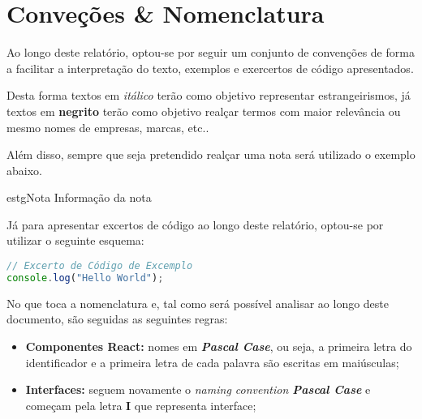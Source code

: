 \chapter*{Conveções \& Nomenclatura}

Ao longo deste relatório, optou-se por seguir um conjunto de convenções de forma a facilitar a interpretação do texto, exemplos e exercertos de código apresentados.

Desta forma textos em \textit{itálico} terão como objetivo representar estrangeirismos, já textos em \textbf{negrito} terão como objetivo realçar termos com maior relevância ou mesmo nomes de empresas, marcas, etc..

Além disso, sempre que seja pretendido realçar uma nota será utilizado o exemplo abaixo.\\[0.01cm]

\begin{mybox}{estg}{Nota}
	Informação da nota
\end{mybox}

\vspace{0.1cm}

Já para apresentar excertos de código ao longo deste relatório, optou-se por utilizar o seguinte esquema:\\[0.01cm]

\begin{lstlisting}[language=Javascript]
// Excerto de Código de Excemplo
console.log("Hello World");
\end{lstlisting}

\vspace{0.1cm}

No que toca a nomenclatura e, tal como será possível analisar ao longo deste documento, são seguidas as seguintes regras:

\begin{itemize}
	\item \textbf{Componentes React:} nomes em \textit{\textbf{Pascal Case}}, ou seja, a primeira letra do identificador e a primeira letra de cada palavra são escritas em maiúsculas;
	\item \textbf{Interfaces:} seguem novamente o \textit{naming convention \textbf{Pascal Case}} e começam pela letra \textbf{I} que representa interface;
\end{itemize}
